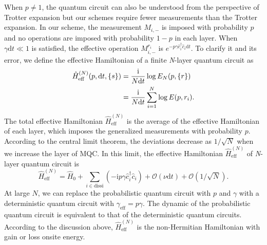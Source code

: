 \documentclass[longbibliography, aps, prx, amsmath, amssymb, amsfonts, twocolumn,superscriptaddress, footinbib]{revtex4-1}
\begin{document}
	When $p\neq1$, the quantum circuit can also be understood from the perspective of Trotter expansion but our schemes require fewer measurements than the Trotter expansion. In our scheme, the measurement $M_{i,-}$ is imposed with probability $p$ and no operations are imposed with probability $1-p$ in each layer. When $\gamma \mathrm{d}t\ll 1$ is satisfied, the effective operation $M_{i,-}^{r_i}$ is $e^{-p \gamma \hat{c}_i^{\dagger} \hat{c}_i \mathrm{d}t} $. To clarify it and its error, we define the effective Hamiltonian of a finite \textit{N}-layer quantum circuit as 
	\begin{align}
		\hat{H}^{(N)}_{\text{eff}} (p,\mathrm{d}t, \{s\}) &= \frac{\mathrm{i}}{N\mathrm{d}t} \log{E_N(p, \{r\})} \notag\\
		&= \frac{\mathrm{i}}{N\mathrm{d}t} \sum_{i=1}^N \log{E(p,r_i)}. \label{eq:effectiveH}
	\end{align}
	The total effective Hamiltonian $\hat{H}^{(N)}_{\text{eff}}$ is the average of the effective Hamiltonian of each layer, which imposes the generalized measurements with probability $p$. According to the central limit theorem, the deviations decrease as $1/\sqrt{N}$ when we increase the layer of MQC. In this limit, the effective 
	Hamiltonian $\hat{H}^{(N)}_{\text{eff}}$ of \textit{N}-layer quantum circuit is 
	\begin{equation}
		\hat{H}^{(N)}_{\text{eff}} = \hat{H}_0 + \sum_{i\in \text{dissi} } (-\mathrm{i} p\gamma \hat{c}_i^{\dagger} \hat{c}_i) + \mathcal{O}(\nu\mathrm{d} t) + \mathcal{O}(1/\sqrt{N}).
	\end{equation}
	At large $N$, we can replace the probabilistic quantum circuit with $p$ and $\gamma$ with a deterministic quantum circuit with $\gamma_{\text{eff}} = p \gamma$. The dynamic of the probabilistic quantum circuit is equivalent to that of the deterministic quantum circuits. According to the discussion above, $\hat{H}^{(N)}_{\text{eff}}$ is the non-Hermitian Hamiltonian with gain or loss onsite energy. 
	
	
\end{document}
